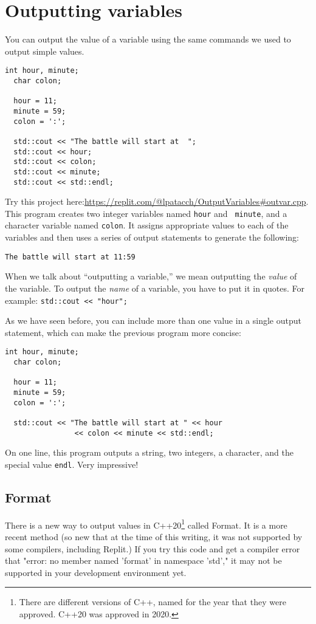 \section{Outputting variables}
\label{output}

You can output the value of a variable using the same commands
we used to output simple values.

\begin{lstlisting}[frame=single]
  int hour, minute;
  char colon;

  hour = 11;
  minute = 59;
  colon = ':';

  std::cout << "The battle will start at  ";
  std::cout << hour;
  std::cout << colon;
  std::cout << minute;
  std::cout << std::endl;
\end{lstlisting}

%
Try this project here:\url{https://replit.com/@lpatacch/OutputVariables#outvar.cpp}.
This program creates two integer variables named {\tt hour} and {\tt
minute}, and a character variable named {\tt colon}.  It assigns
appropriate values to each of the variables and then uses a series
of output statements to generate the following:

\begin{verbatim}
The battle will start at 11:59
\end{verbatim}

When we talk about ``outputting a variable,'' we mean outputting the
{\em value} of the variable.  To output the {\em name} of a variable,
you have to put it in quotes.  For example: {\tt std::cout << "hour";}

As we have seen before, you can include more than one value in
a single output statement, which can make the previous program more
concise:

\begin{lstlisting}[frame=single]
  int hour, minute;
  char colon;

  hour = 11;
  minute = 59;
  colon = ':';

  std::cout << "The battle will start at " << hour 
                << colon << minute << std::endl;
\end{lstlisting}
%
On one line, this program outputs a string, two integers, a character,
and the special value {\tt endl}.  Very impressive!

\subsection{Format}
There is a new way to output values in C++20\footnote{There are different
versions of C++, named for the year that they were approved. C++20 was
approved in 2020.} called Format. It is a
more recent method (so new that at the time of this writing, it was not
supported by some compilers, including Replit.) If 
you try this code and get a compiler error that "error: no member 
named 'format' in namespace 'std'," it may not be supported in your development environment yet.

